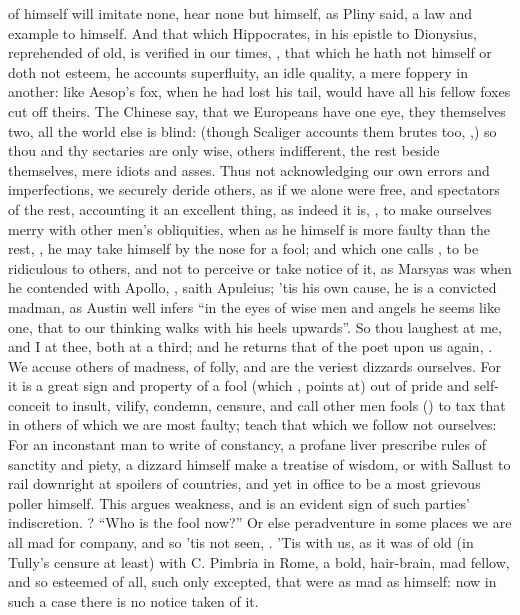 of himself will imitate none, hear none
but himself, as Pliny said, a law and example to himself.
And that which Hippocrates, in his epistle to Dionysius, reprehended of old, is
verified in our times, , that which he hath not himself or doth not esteem, he
accounts superfluity, an idle quality, a mere foppery in another: like Aesop's
fox, when he had lost his tail, would have all his fellow foxes cut off theirs.
The Chinese say, that we Europeans have one eye, they themselves two, all the
world else is blind: (though Scaliger accounts them brutes
too, ,) so thou and thy sectaries are only wise, others
indifferent, the rest beside themselves, mere idiots and asses. Thus not
acknowledging our own errors and imperfections, we securely deride others, as
if we alone were free, and spectators of the rest, accounting it an excellent
thing, as indeed it is, , to make ourselves
merry with other men's obliquities, when as he himself is more faulty than the
rest, , he may take himself by the
nose for a fool; and which one calls , to be
ridiculous to others, and not to perceive or take notice of it, as Marsyas was
when he contended with Apollo, , saith
Apuleius; 'tis his own cause, he is a convicted madman, as
Austin well infers \enquote{in the eyes of wise men and angels he
seems like one, that to our thinking walks with his heels upwards}. So thou
laughest at me, and I at thee, both at a third; and he returns that of the poet
upon us again, . We accuse others of madness, of folly, and are the veriest
dizzards ourselves. For it is a great sign and property of a fool (which
, points at) out of pride and self-conceit to insult,
vilify, condemn, censure, and call other men fools () to tax that in others of which we are most faulty; teach
that which we follow not ourselves: For an inconstant man to write of
constancy, a profane liver prescribe rules of sanctity and piety, a dizzard
himself make a treatise of wisdom, or with Sallust to rail downright at
spoilers of countries, and yet in office to be a most
grievous poller himself. This argues weakness, and is an evident sign of such
parties' indiscretion. ? \enquote{Who is the fool now?} Or else peradventure in some places we are all
mad for company, and so 'tis not seen, . 'Tis with us, as it was of old
(in Tully's censure at least) with C. Pimbria in Rome, a
bold, hair-brain, mad fellow, and so esteemed of all, such only excepted, that
were as mad as himself: now in such a case there is no
notice taken of it.


